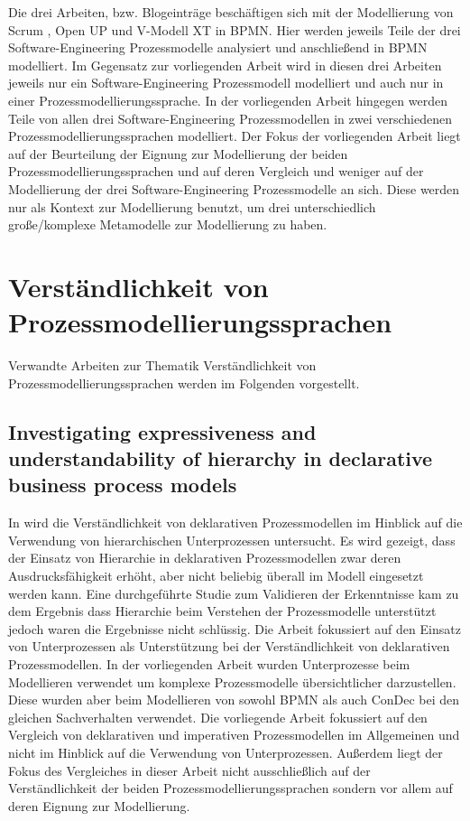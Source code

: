 Die drei Arbeiten, bzw. Blogeinträge beschäftigen sich mit der Modellierung von Scrum \cite{software}, Open UP \cite{brunner2007fallstudie} und \cite{Bregenzer2014} V-Modell XT in BPMN. Hier werden jeweils Teile der drei Software-Engineering Prozessmodelle analysiert und anschließend in BPMN modelliert.\newline
Im Gegensatz zur vorliegenden Arbeit wird in diesen drei Arbeiten jeweils nur ein Software-Engineering Prozessmodell modelliert und auch nur in einer Prozessmodellierungssprache. In der vorliegenden Arbeit hingegen werden Teile von allen drei Software-Engineering Prozessmodellen in zwei verschiedenen Prozessmodellierungssprachen modelliert. Der Fokus der vorliegenden Arbeit liegt auf der Beurteilung der Eignung zur Modellierung der beiden Prozessmodellierungssprachen und auf deren Vergleich und weniger auf der Modellierung der drei Software-Engineering Prozessmodelle an sich. Diese werden nur als Kontext zur Modellierung benutzt, um drei unterschiedlich große/komplexe Metamodelle zur Modellierung zu haben.\newline


\section{Verständlichkeit von Prozessmodellierungssprachen}

Verwandte Arbeiten zur Thematik Verständlichkeit von Prozessmodellierungssprachen werden im Folgenden vorgestellt.

\subsection{Investigating expressiveness and understandability of hierarchy
in declarative business process models}

In \cite{sabrina942} wird die Verständlichkeit von deklarativen Prozessmodellen im Hinblick auf die Verwendung von hierarchischen Unterprozessen untersucht. Es wird gezeigt, dass der Einsatz von Hierarchie in deklarativen Prozessmodellen zwar deren Ausdrucksfähigkeit erhöht, aber nicht beliebig überall im Modell eingesetzt werden kann. Eine durchgeführte Studie zum Validieren der Erkenntnisse kam zu dem Ergebnis dass Hierarchie beim Verstehen der Prozessmodelle unterstützt jedoch waren die Ergebnisse nicht schlüssig.\newline
Die Arbeit  \cite{sabrina942} fokussiert auf den Einsatz von Unterprozessen als Unterstützung bei der Verständlichkeit von deklarativen Prozessmodellen. In der vorliegenden Arbeit wurden Unterprozesse beim Modellieren verwendet um komplexe Prozessmodelle übersichtlicher darzustellen. Diese wurden  aber beim Modellieren von sowohl BPMN als auch ConDec bei den gleichen Sachverhalten verwendet. Die vorliegende Arbeit fokussiert auf den Vergleich von deklarativen und imperativen Prozessmodellen im Allgemeinen und nicht im Hinblick auf die Verwendung von Unterprozessen. Außerdem liegt der Fokus des Vergleiches in dieser Arbeit nicht ausschließlich auf der Verständlichkeit der beiden Prozessmodellierungssprachen sondern vor allem auf deren Eignung zur Modellierung.\newline


